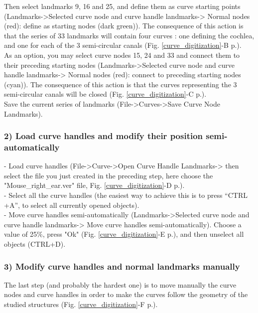 \documentclass[12pt, a4paper]{book}
\begin{document}
Then select landmarks 9, 16 and 25, and define them as curve starting points (Landmarks->Selected curve node and curve handle landmarks-> Normal nodes (red): define as starting nodes (dark green)). The consequence of this action is that the series of 33 landmarks will contain four
curves : one defining the cochlea, and one for each of the 3 semi-circular canals (Fig. \ref{curve_digitization}-B p.\pageref{curve_digitization}).\\

As an option, you may select curve nodes 15, 24 and 33 and connect them to their preceding starting
nodes (Landmarks->Selected curve node and curve handle landmarks-> Normal nodes (red): connect
to preceding starting nodes (cyan)). The consequence of this action is that the curves representing
the 3 semi-circular canals will be closed (Fig. \ref{curve_digitization}-C p.\pageref{curve_digitization}).\\
Save the current series of landmarks (File->Curves->Save Curve Node Landmarks).

\subsubsection{2) Load curve handles and modify their position semi-automatically}
- Load curve handles (File->Curve->Open Curve Handle Landmarks-> then select the file you just created
in the preceding step, here choose the "Mouse\_right\_ear.ver" file, Fig. \ref{curve_digitization}-D p.\pageref{curve_digitization}).\\
- Select all the curve handles (the easiest way to achieve this is to press “CTRL +A”, to select all currently
opened objects).\\
- Move curve handles semi-automatically (Landmarks->Selected curve node and curve handle landmarks-> Move curve handles semi-automatically). Choose a value of 25\%, press "Ok" (Fig. \ref{curve_digitization}-E p.\pageref{curve_digitization}), and then unselect all objects (CTRL+D).\\

\subsubsection{3) Modify curve handles and normal landmarks manually}
The last step (and probably the hardest one) is to move manually the curve nodes and curve handles in order to make the curves follow the geometry of the studied structures (Fig. \ref{curve_digitization}-F p.\pageref{curve_digitization}).
\end{document}
